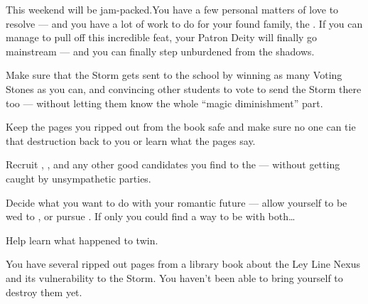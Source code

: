 \documentclass[char]{GL2020}
\begin{document}
This weekend will be jam-packed.You have a few personal matters of love to resolve — and you have a lot of work to do for your found family, the \pGoaties{}. If you can manage to pull off this incredible feat, your Patron Deity will finally go mainstream — and you can finally step unburdened from the shadows.
 
\begin{itemz}
    \item Make sure that the Storm gets sent to the school by winning as many Voting Stones as you can, and convincing other students to vote to send the Storm there too — without letting them know the whole “magic diminishment” part.
   \item Keep the pages you ripped out from the book safe and make sure no one can tie that destruction back to you or learn what the pages say.
    \item Recruit \cAmbition{}, \cHeir{}, and any other good candidates you find to the \pGoaties{} — without getting caught by unsympathetic parties.
    \item Decide what you want to do with your romantic future — allow yourself to be wed to \cHeir{}, or pursue \cPresident{}. If only you could find a way to be with both\ldots{}
    \item Help \cWildCard{} learn what happened to \cWildCard{\their} twin.
\end{itemz}
   
\begin{itemz}[Notes]
    \item You have several ripped out pages from a library book about the Ley Line Nexus and its vulnerability to the Storm. You haven’t been able to bring yourself to destroy them yet.
\end{itemz}
 
\end{document}
